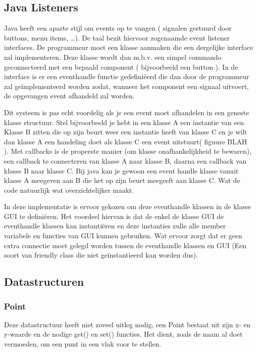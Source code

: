\documentclass[a4paper,11pt,oneside, titlepage]{article}
\begin{document}
\subsection{Java Listeners}
Java heeft een aparte stijl om events op te vangen ( signalen gestuurd door buttons, menu items,
\ldots ). De taal bezit hiervoor zogenaamde event listener interfaces. De programmeur
moet een klasse aanmaken die een dergelijke interface zal implementeren. Deze klasse wordt dan
m.b.v. een simpel commando geconnecteerd met een bepaald component ( bijvoorbeeld een button ).
In de interface is er een eventhandle functie gedefini\"eerd die dan door de programmeur zal 
ge\"implementeerd worden zodat, wanneer het component een signaal uitvoert,
de opgevangen event afhandeld zal worden.\newline

Dit systeem is pas echt voordelig als je een event moet afhandelen in een geneste klasse 
structuur. Stel bijvoorbeeld je hebt in een klasse A een instantie van een Klasse B zitten
die op zijn beurt weer een instantie heeft van klasse C en je wilt dan klasse A een handeling
doet als klasse C een event uitstuurt( figuure BLAH ). 
Met callbacks is de properste manier (om klasse onafhankelijkheid te bewaren), een callback 
te connecteren van klasse A naar klasse B, daarna een callback van klasse B naar klasse C. 
Bij java kan je gewoon een event handle klasse vanuit klasse A meegeven aan B die het op zijn 
beurt meegeeft aan klasse C. Wat de code natuurlijk wat overzichtelijker maakt.\newline \newline

In deze implementatie is ervoor gekozen om deze eventhandle klassen in de klasse GUI te 
defini\"eren. Het voordeel hiervan is dat de enkel de klasse GUI de eventhandle klassen kan 
instanti\"eren en deze instanties zulle alle member variabele en functies van GUI kunnen 
gebruiken. Wat ervoor zorgt dat er geen extra connectie moet gelegd worden tussen de 
eventhandle klassen en GUI (Een soort van friendly class die niet ge\"instantieerd kan worden 
dus). 
\subsection{Datastructuren}
\subsubsection{Point}
Deze datastructuur heeft niet zoveel uitleg nodig, een Point bestaat uit zijn x- en y-waarde
en de nodige get() en set() functies. Het dient, zoals de naam al doet vermoeden, om een punt
in een vlak voor te stellen.
\end{document}
